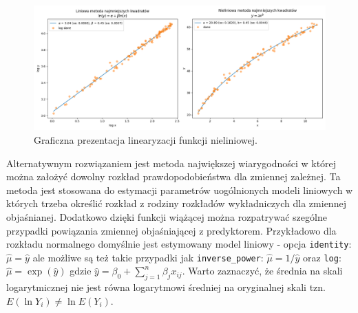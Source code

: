 \documentclass[polish,]{book}
\begin{document}
\begin{figure}[h]

{\centering \includegraphics[width=1\linewidth]{modlin01} 

}

\caption{Graficzna prezentacja linearyzacji funkcji nieliniowej.}\label{fig:modlin01}
\end{figure}

Alternatywnym rozwiązaniem jest metoda największej wiarygodności w której można założyć dowolny rozkład prawdopodobieństwa dla zmiennej zależnej. Ta metoda jest stosowana do estymacji parametrów uogólnionych modeli liniowych w których trzeba określić rozkład z rodziny rozkładów wykładniczych dla zmiennej objaśnianej. Dodatkowo dzięki funkcji wiążącej można rozpatrywać szególne przypadki powiązania zmiennej objaśniającej z predyktorem. Przykładowo dla rozkładu normalnego domyślnie jest estymowany model liniowy - opcja \texttt{identity}: \(\hat{\mu}=\hat{y}\) ale możliwe są też takie przypadki jak \texttt{inverse\_power}: \(\hat{\mu}=1/\hat{y}\) oraz \texttt{log}: \(\hat{\mu}=\exp(\hat{y})\) gdzie \(\hat{y}=\beta_0+\sum_{j=1}^{n}\beta_j x_{ij}\). Warto zaznaczyć, że
średnia na skali logarytmicznej nie jest równa logarytmowi średniej na oryginalnej skali tzn.
\(E(\ln Y_i)\neq \ln E(Y_i)\).
\end{document}
